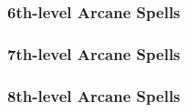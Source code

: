 \subsubsection{6th-level Arcane Spells}
\begin{swspelllist}

    \SLauraofimmunity[Abjur]


    \SLprohibition[Div]
    \SLspellsight
    \SLtrueseeing

    \SLdominateperson[Ench]
    \SLphantasmalkiller

    \SLchainlightning[Evoc]
    \SLinferno
    \SLpolarray
    \SLprohibition
    \SLrepulsion
    \SLshadowwall

    \SLshadowwall[Illus]

    \SLdisintegrate[Trans]
    \SLtemporalstasis

    \SLfingerofdeath[Vivi]
    \SLharm
    \SLpowerwordblind

    \SLprismaticspray[Univ]

\end{swspelllist}

\subsubsection{7th-level Arcane Spells}
\begin{swspelllist}

    \SLantimagicfield[Abjur]
    \SLavatarofshielding
    \SLgolemheart

    \SLavataroftranslocation[Conj]
    \SLicestorm

    \SLscrybolt[Div]

    \SLavataroffealty[Ench]
    \SLdiscordantsong
    \SLfeeblemind

    \SLavatarofwind[Evoc]
    \SLicestorm
    \SLimmolation
    \SLshadowstorm

    \SLshadowstorm[Illus]
    \SLsunburst

    \SLgolemheart[Trans]

    \SLscrybolt[Vivi]
    \SLstriptheflesh

\end{swspelllist}

\subsubsection{8th-level Arcane Spells}
\begin{swspelllist}

    \SLsevermagic[Abjur]

    \SLbladestorm[Conj]
    \SLimprisonment

    \SLshadowduplicate[Div]
    \SLthirdeye

    \SLavatarofsuffering[Ench]

    \SLforcecage[Evoc]

    \SLshadowduplicate[Illus]

    \SLimprisonment[Trans]
    \SLreversegravity

    \SLavatarofdeath[Vivi]
    \SLlifebound

\end{swspelllist}

